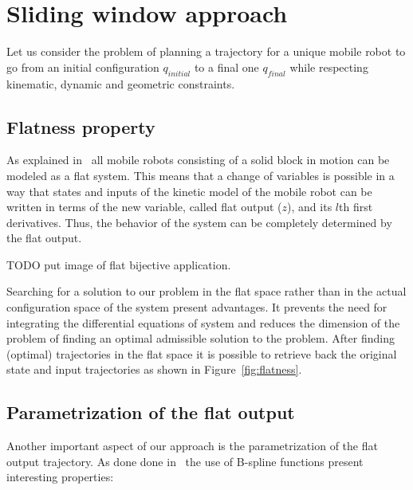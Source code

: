 \documentclass[eprint]{actapoly}
\begin{document}
\section{}


\section{Sliding window approach}


Let us consider the problem of planning a trajectory for a unique mobile robot
to go from an initial configuration $q_{initial}$ to a final one $q_{final}$ while
respecting kinematic, dynamic and geometric constraints.

\subsection{Flatness property}

As explained in~\cite{Defoort2007a} all mobile robots consisting of a solid
block in motion can be modeled as a flat system. 
This means that a change of variables is possible in a way that states and
inputs of the kinetic model of the mobile robot can be written in terms
of the new variable, called flat output ($z$), and its $l$th first derivatives.
Thus, the behavior of the system can be completely determined by the flat
output.

TODO put image of flat bijective application.

Searching for a solution to our problem in the flat space rather than in
the actual configuration space of the system present advantages.
It prevents the need for integrating the differential equations
of system and reduces the dimension of the problem of finding an optimal
admissible solution to the problem.
After finding (optimal) trajectories in the flat space it is possible
to retrieve back the original state and input trajectories as shown in
Figure~\ref{fig:flatness}.

\subsection{Parametrization of the flat output}

Another important aspect of our approach is the parametrization of 
the flat output trajectory. As done done in~\cite{milam2003} the use
of B-spline functions present interesting properties:
\end{document}

